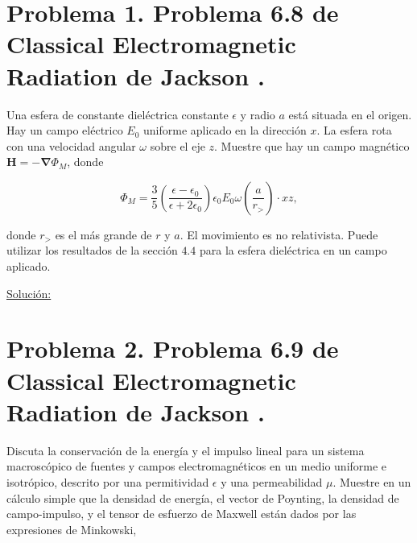 \documentclass[a4paper,11pt]{article}
\numberwithin{equation}{section}
\renewcommand{\thefootnote}{\fnsymbol{footnote}}
\begin{document}
\fancyhead[R]{\thepage}

\setcounter{footnote}{0}
\renewcommand*{\thefootnote}{\arabic{footnote}}


\section{Problema 1. Problema 6.8 de Classical Electromagnetic Radiation
de Jackson \cite{jackson}.}

Una esfera de constante dieléctrica constante $\epsilon$ y radio $a$ está situada 
en el origen. Hay un campo eléctrico $E_0$ uniforme aplicado en la dirección $x$. 
La esfera rota con una velocidad angular $\omega$ sobre el eje $z$. Muestre que 
hay un campo magnético $\mathbf{H} = - \mathbf{\nabla} \Phi_M$, donde 

$$
\Phi_M = \frac{3}{5}\left(\frac{\epsilon - \epsilon_0}{\epsilon + 2\epsilon_0}\right)
\epsilon_0E_0\omega\left(\frac{a}{r_>}\right)\cdot xz,
$$

donde $r_>$ es el más grande de $r$ y $a$. El movimiento es no relativista. Puede 
utilizar los resultados de la sección $4.4$ para la esfera dieléctrica en un campo 
aplicado.

\vspace{.3cm}

\underline{Solución:} \vspace{.3cm}

\newpage

\section{Problema 2. Problema 6.9 de Classical Electromagnetic Radiation
de Jackson \cite{jackson}.}

Discuta la conservación de la energía y el impulso lineal para un sistema macroscópico 
de fuentes y campos electromagnéticos en un medio uniforme e isotrópico, descrito 
por una permitividad $\epsilon$ y una permeabilidad $\mu$. Muestre en un cálculo 
simple que la densidad de energía, el vector de Poynting, la densidad de campo-impulso, 
y el tensor de esfuerzo de Maxwell están dados por las expresiones de Minkowski,
\end{document}

